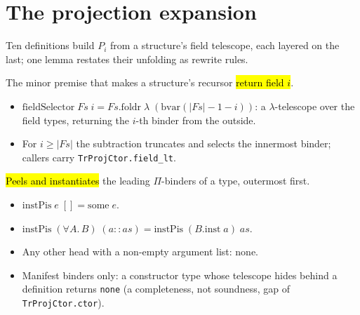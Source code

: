 \section{The projection expansion}

Ten definitions build $P_i$ from a structure's field telescope, each layered on the last; one
lemma restates their unfolding as rewrite rules.

\begin{definition}
  \label{def:proj-field-selector}
  \leanok

   The minor premise that makes a structure's recursor \hl{return field $i$}.
  \begin{itemize}
  \item $\mathrm{fieldSelector}\;Fs\;i = Fs.\mathrm{foldr}\;\lambda\;(\mathrm{bvar}(|Fs|-1-i))$: a
        $\lambda$-telescope over the field types, returning the $i$-th binder from the outside.
  \item {} For $i \ge |Fs|$ the subtraction truncates and selects the innermost binder;
        callers carry \texttt{TrProjCtor.field\_lt}.
  \end{itemize}
\end{definition}

\begin{definition}
  \label{def:proj-inst-pis}
  \leanok

   \hl{Peels and instantiates} the leading $\Pi$-binders of a type, outermost
  first.
  \begin{itemize}
  \item $\mathrm{instPis}\;e\;[] = \mathrm{some}\;e$.
  \item $\mathrm{instPis}\;(\forall A.\,B)\;(a::as) = \mathrm{instPis}\;(B.\mathrm{inst}\;a)\;as$.
  \item Any other head with a non-empty argument list: $\mathrm{none}$.
  \item {} Manifest binders only: a constructor type whose telescope hides behind a
        definition returns \texttt{none} (a completeness, not soundness, gap of
        \texttt{TrProjCtor.ctor}).
  \end{itemize}
\end{definition}

